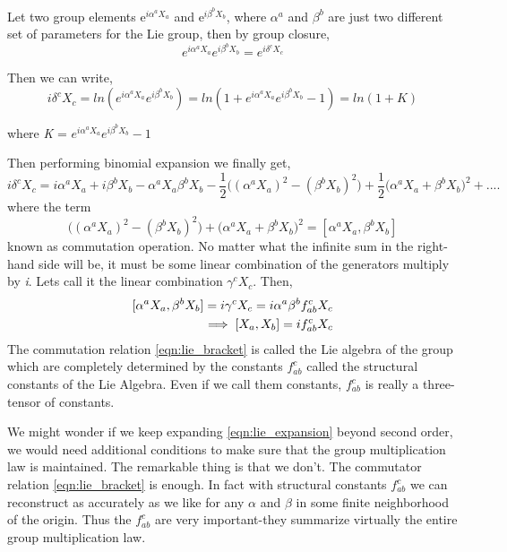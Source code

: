 Let two group elements e$^{i\alpha^aX_a}$ and e$^{i\beta^bX_b}$, where $\alpha^a$ and $\beta^b$ are just two different set of
parameters for the Lie group, then by group closure,
\begin{equation}
    e^{i\alpha^aX_a} e^{i\beta^bX_b} = e^{i\delta^cX_c}
\end{equation}

Then we can write, 
\begin{equation}
    i\delta^cX_c = ln(e^{i\alpha^aX_a} e^{i\beta^bX_b}) = ln(1+ e^{i\alpha^aX_a} e^{i\beta^bX_b} -1) = ln(1+K)
    \label{eqn:lie_expansion}
\end{equation}

where \textit{K} = $e^{i\alpha^aX_a} e^{i\beta^bX_b} -1$

Then performing binomial expansion we finally get,
\begin{equation}
    i\delta^cX_c = i\alpha^aX_a + i\beta^bX_b - \alpha^aX_a \beta^bX_b - \frac{1}{2}\Big((\alpha^aX_a)^2-(\beta^bX_b)^2\Big) + \frac{1}{2}\Big(\alpha^aX_a + \beta^bX_b\Big)^2 + ....
\end{equation}
where the term 
\begin{equation}
    \Big((\alpha^aX_a)^2-(\beta^bX_b)^2\Big) + \Big(\alpha^aX_a + \beta^bX_b\Big)^2 = [\alpha^aX_a, \beta^bX_b]
\end{equation}
known as commutation operation.
No matter what the infinite sum in the right-hand side will be, it must be some linear combination of the generators multiply by \textit{i}.
Lets call it the linear combination $\gamma^c X_c$. Then,
\begin{equation}
    \begin{aligned}
        \relax [\alpha^aX_a, \beta^bX_b] = i\gamma^c X_c = i \alpha^a \beta^b f^c_{ab} X_c\\
       \implies [X_a, X_b] = i f^c_{ab} X_c 
    \end{aligned}
    \label{eqn:lie_bracket}
\end{equation}
The commutation relation \ref{eqn:lie_bracket} is called the Lie algebra of the group
which are completely determined by the constants $f^c_{ab}$ called the structural constants of the Lie Algebra. 
Even if we call them constants, $f^c_{ab}$ is really a three-tensor of constants.

We might wonder if we keep expanding \ref{eqn:lie_expansion} beyond second order, we would need additional conditions to make sure that the group multiplication law is maintained. 
The remarkable thing is that we don't. The commutator relation \ref{eqn:lie_bracket} is enough. 
In fact with structural constants $f^c_{ab}$ we can reconstruct as accurately as we like for any $\alpha$ and $\beta$ in some finite neighborhood of the origin. 
Thus the $f^c_{ab}$ are very important-they summarize virtually the entire group multiplication law.

